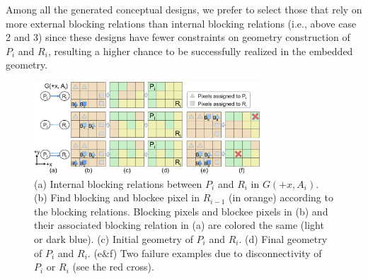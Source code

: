 Among all the generated conceptual designs, we prefer to select those that rely on more external blocking relations than internal blocking relations (i.e., above case 2 and 3) since these designs have fewer constraints on geometry construction of $P_i$ and $R_i$, resulting a higher chance to be successfully realized in the embedded geometry.
\fi








\begin{figure}[!b]
	\centering
	\vspace*{-3.5mm}
	\includegraphics[width=8.45cm]{images/Framework_Blocking.png}
	\vspace*{-2.5mm}
	\caption{
		(a) Internal blocking relations between $P_i$ and $R_i$ in $G(+x, A_i)$.
		(b) Find blocking and blockee pixel in $R_{i-1}$ (in orange) according to the blocking relations.
		Blocking pixels and blockee pixels in (b) and their associated blocking relation in (a) are colored the same (light or dark blue).
		(c) Initial geometry of $P_i$ and $R_i$.
		(d) Final geometry of $P_i$ and $R_i$.
		(e\&f) Two failure examples due to disconnectivity of $P_i$ or $R_i$ (see the red cross).}
	\label{fig:Framework_Blocking}
\end{figure}

